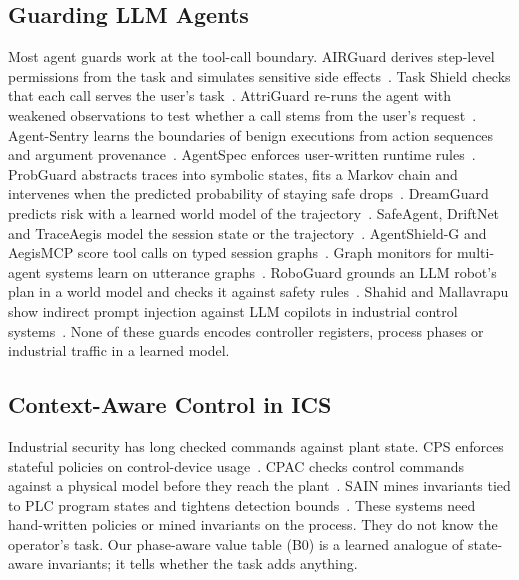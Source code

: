 \documentclass[journal]{IEEEtran}
\begin{document}
\subsection{Guarding LLM Agents}
Most agent guards work at the tool-call boundary. AIRGuard derives step-level permissions from the task and simulates sensitive side effects~\cite{qin2026airguard}. Task Shield checks that each call serves the user's task~\cite{jia2025taskshield}. AttriGuard re-runs the agent with weakened observations to test whether a call stems from the user's request~\cite{he2026attriguard}. Agent-Sentry learns the boundaries of benign executions from action sequences and argument provenance~\cite{sequeira2026agentsentry}. AgentSpec enforces user-written runtime rules~\cite{wang2025agentspec}. ProbGuard abstracts traces into symbolic states, fits a Markov chain and intervenes when the predicted probability of staying safe drops~\cite{wang2025probguard}. DreamGuard predicts risk with a learned world model of the trajectory~\cite{lin2026dreamguard}. SafeAgent, DriftNet and TraceAegis model the session state or the trajectory~\cite{liu2026safeagent,pinjari2026driftnet,traceaegis2025}. AgentShield-G and AegisMCP score tool calls on typed session graphs~\cite{divi2026agentshieldg,zhan2025aegismcp}. Graph monitors for multi-agent systems learn on utterance graphs~\cite{wang2025gsafeguard,pan2025xgguard,zhou2025guardian}. RoboGuard grounds an LLM robot's plan in a world model and checks it against safety rules~\cite{ravichandran2026roboguard}. Shahid and Mallavrapu show indirect prompt injection against LLM copilots in industrial control systems~\cite{shahid2026copilots}. None of these guards encodes controller registers, process phases or industrial traffic in a learned model.

\subsection{Context-Aware Control in ICS}
Industrial security has long checked commands against plant state. CPS enforces stateful policies on control-device usage~\cite{mclaughlin2013cps}. CPAC checks control commands against a physical model before they reach the plant~\cite{etigowni2016cpac}. SAIN mines invariants tied to PLC program states and tightens detection bounds~\cite{abbas2024sain}. These systems need hand-written policies or mined invariants on the process. They do not know the operator's task. Our phase-aware value table (B0) is a learned analogue of state-aware invariants; it tells whether the task adds anything.
\end{document}
